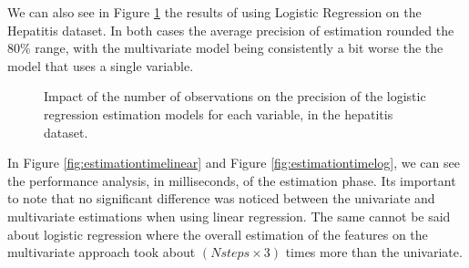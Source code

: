 We can also see in Figure \ref{fig:estimationlogh} the results of using Logistic Regression on the
 Hepatitis dataset. In both cases the average precision of estimation rounded the 80\% range, with the multivariate model being consistently
 a bit worse the the model that uses a single variable.
 
 \begin{figure}[h]
	\begin{subfigmatrix}{2}
  \end{subfigmatrix}
  \caption{Impact of the number of observations on the precision of the logistic regression estimation models for each variable, in the hepatitis dataset.}
  \label{fig:estimationlogh}
\end{figure}


In Figure \ref{fig:estimationtimelinear} and Figure \ref{fig:estimationtimelog}, we can see the performance analysis, in milliseconds, of the estimation
 phase. Its important to note that no significant difference was noticed between the univariate and multivariate estimations when using linear regression.
 The same cannot be said about logistic regression where the overall estimation of the features on the multivariate
approach took about $(N steps \times 3)$ times more than the univariate.

